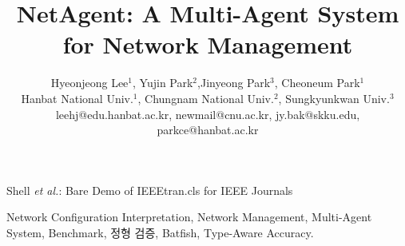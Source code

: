\documentclass[journal]{IEEEtran}
\begin{document}
\title{NetAgent: A Multi-Agent System for Network Management}


\author{
Hyeonjeong Lee$^{1}$, Yujin Park$^{2}$,Jinyeong Park$^{3}$, Cheoneum Park$^{1}$\footnotemark[*] \\
Hanbat National Univ.$^{1}$, Chungnam National Univ.$^{2}$, Sungkyunkwan Univ.$^{3}$\\ 
leehj@edu.hanbat.ac.kr, newmail@cnu.ac.kr, jy.bak@skku.edu, parkce@hanbat.ac.kr

}


%
{Shell \MakeLowercase{\textit{et al.}}: Bare Demo of IEEEtran.cls for IEEE Journals}




\maketitle

\begin{abstract}
    
\end{abstract}

\begin{IEEEkeywords}
  Network Configuration Interpretation, Network Management, Multi-Agent System, Benchmark, 정형 검증, Batfish, Type-Aware Accuracy. 
\end{IEEEkeywords}


\IEEEpeerreviewmaketitle












\end{document}
